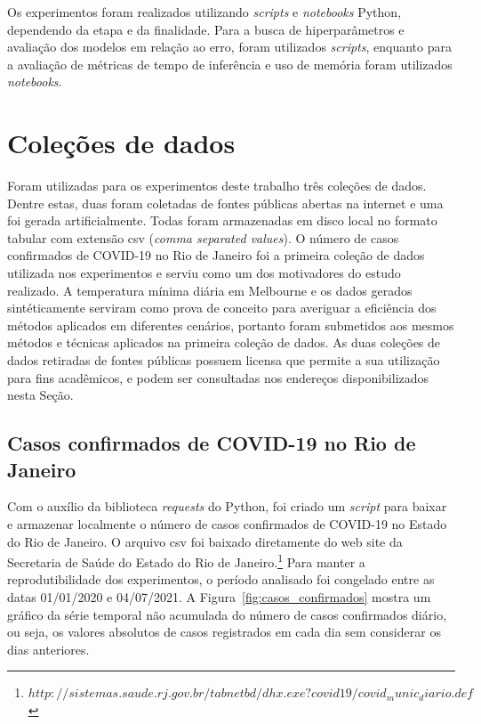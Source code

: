 Os experimentos foram realizados utilizando \textit{scripts} e \textit{notebooks} Python, dependendo da etapa e da finalidade. Para a busca de hiperparâmetros e avaliação dos modelos em relação ao erro, foram utilizados \textit{scripts}, enquanto para a avaliação de métricas de tempo de inferência e uso de memória foram utilizados \textit{notebooks}.

\section{Coleções de dados}
Foram utilizadas para os experimentos deste trabalho três coleções de dados. Dentre estas, duas foram coletadas de fontes públicas abertas na internet e uma foi gerada artificialmente. Todas foram armazenadas em disco local no formato tabular com extensão csv (\textit{comma separated values}). O número de casos confirmados de COVID-19 no Rio de Janeiro foi a primeira coleção de dados utilizada nos experimentos e serviu como um dos motivadores do estudo realizado. A temperatura mínima diária em Melbourne e os dados gerados sintéticamente serviram como prova de conceito para averiguar a eficiência dos métodos aplicados em diferentes cenários, portanto foram submetidos aos mesmos métodos e técnicas aplicados na primeira coleção de dados. As duas coleções de dados retiradas de fontes públicas possuem licensa que permite a sua utilização para fins acadêmicos, e podem ser consultadas nos endereços disponibilizados nesta Seção.

\subsection{Casos confirmados de COVID-19 no Rio de Janeiro}\label{subsec:casos_confirmados}
Com o auxílio da biblioteca \textit{requests} do Python, foi criado um \textit{script} para baixar e armazenar localmente o número de casos confirmados de COVID-19 no Estado do Rio de Janeiro. O arquivo csv foi baixado diretamente do web site da Secretaria de Saúde do Estado do Rio de Janeiro.\footnote{$http://sistemas.saude.rj.gov.br/tabnetbd/dhx.exe?covid19/covid_munic_diario.def$} Para manter a reprodutibilidade dos experimentos, o período analisado foi congelado entre as datas 01/01/2020 e 04/07/2021. A Figura~\ref{fig:casos_confirmados} mostra um gráfico da série temporal não acumulada do número de casos confirmados diário, ou seja, os valores absolutos de casos registrados em cada dia sem considerar os dias anteriores.


